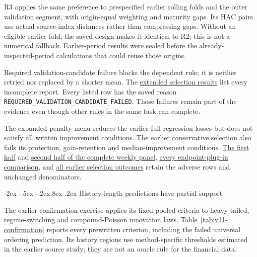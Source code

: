\documentclass[10pt,a4paper]{article}
\makeatletter
\renewcommand\section{\@startsection{section}{1}{\z@}%
  {-2ex \@plus -.5ex \@minus -.2ex}{.8ex \@plus .2ex}%
  {\normalfont\large\bfseries}}
\makeatother
\begin{document}
R3 applies the same preference to prespecified earlier rolling folds and the
outer validation segment, with origin-equal weighting and maturity gaps.
Its HAC pairs use actual source-index distances rather than compressing gaps.
Without an eligible earlier fold, the saved design makes it identical to R2;
this is not a numerical fallback. Earlier-period results were sealed before
the already-inspected-period calculations that could reuse those origins.

Required validation-candidate failure blocks the dependent rule;
it is neither retried nor replaced by a shorter mean. The \href{https://github.com/ByronLi0207/financial-mathematics-paper-20261020/blob/submission-final/EXTENDED_RESULTS.md#asmbi-extended-s15}{extended selection results} list every incomplete report. Every listed row has the saved reason
\texttt{REQUIRED\_VALIDATION\_CANDIDATE\_FAILED}. Those failures remain part of
the evidence even though other rules in the same task can complete.

The expanded penalty menu reduces the earlier full-regression losses but does not satisfy all written improvement conditions. The earlier conservative selection also fails its protection, gain-retention and median-improvement conditions. \href{https://github.com/ByronLi0207/financial-mathematics-paper-20261020/blob/submission-final/EXTENDED_RESULTS.md#asmbi-extended-s11}{The first half} and \href{https://github.com/ByronLi0207/financial-mathematics-paper-20261020/blob/submission-final/EXTENDED_RESULTS.md#asmbi-extended-s12}{second half of the complete weekly panel}, \href{https://github.com/ByronLi0207/financial-mathematics-paper-20261020/blob/submission-final/EXTENDED_RESULTS.md#asmbi-extended-s13}{every endpoint-plug-in comparison}, and \href{https://github.com/ByronLi0207/financial-mathematics-paper-20261020/blob/submission-final/EXTENDED_RESULTS.md#asmbi-extended-s14}{all earlier selection outcomes} retain the adverse rows and unchanged denominators.

\FloatBarrier


\section{History-length predictions have partial support}\label{sup:v11-history}\label{sup:submission-wp2}

The earlier confirmation exercise applies its fixed pooled criteria to heavy-tailed, regime-switching and compound-Poisson innovation laws. Table~\ref{tab:v11-confirmation} reports every prewritten criterion, including the failed universal ordering prediction. Its history regions use method-specific thresholds estimated in the earlier source study; they are not an oracle rule for the financial data.
\end{document}
